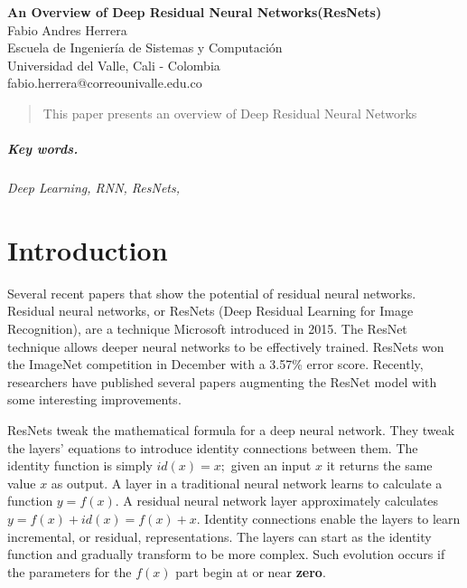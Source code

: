 \documentclass[12pt]{article}
\numberwithin{equation}{section}
\numberwithin{table}{section}
\numberwithin{figure}{section}
\begin{document}

\begin{center}
\textbf{\Large An Overview of Deep Residual Neural Networks\newline(ResNets)} \\[6pt]
  Fabio Andres Herrera \\[6pt]
  Escuela de Ingeniería de Sistemas y Computación\\
  Universidad del Valle, Cali - Colombia  \\[6pt]
  fabio.herrera@correounivalle.edu.co
\end{center}

\begin{abstract}
	
This paper presents an overview of Deep Residual Neural Networks 
\end{abstract}

\subparagraph{\textit{Key words.}}\textit{ Deep Learning, RNN, ResNets, }


\section{Introduction}


Several recent papers that show the potential of residual neural networks. Residual neural networks, or ResNets (Deep Residual Learning for Image Recognition), are a technique Microsoft introduced in 2015. The ResNet technique allows deeper neural networks to be effectively trained. ResNets won the ImageNet competition in December with a 3.57\% error score. Recently, researchers have published several papers augmenting the ResNet model with some interesting improvements.

ResNets tweak the mathematical formula for a deep neural network. They tweak the layers’ equations to introduce identity connections between them. The identity function is simply $id(x) = x;$ given an input $x$ it returns the same value $x$ as output. A layer in a traditional neural network learns to calculate a function $y = f(x)$. A residual neural network layer approximately calculates $y = f(x) + id(x) = f(x) + x$. Identity connections enable the layers to learn incremental, or residual, representations. The layers can start as the identity function and gradually transform to be more complex. Such evolution occurs if the parameters for the $f(x)$ part begin at or near \textbf{zero}.
\end{document}
